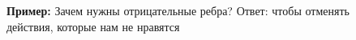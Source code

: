 \begin{figure}[h]
\hfill
\hspace{-4ex} \begin{minipage}[h]{0.5\linewidth}
\par \textbf{Пример:} Зачем нужны отрицательные ребра? Ответ: чтобы отменять действия, которые нам не нравятся
\end{minipage}
\hspace{-4ex} \begin{minipage}[h]{0.5\linewidth}
\end{minipage}

\end{figure}
\setcounter{section}{72}
